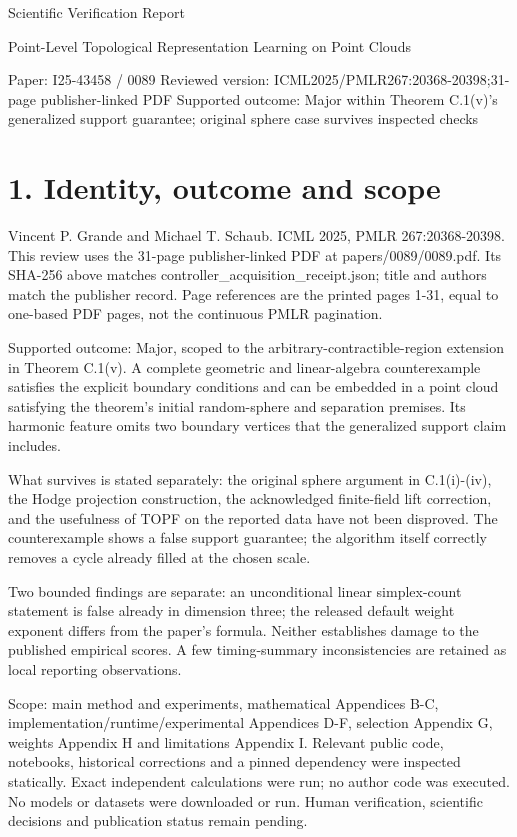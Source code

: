 \documentclass[10pt]{article}
\begin{document}
Scientific Verification Report\par
Point-Level Topological Representation Learning on Point Clouds\par
Paper: I25-43458 / 0089
Reviewed version: ICML2025/PMLR267:20368-20398;31-page publisher-linked PDF
Supported outcome: Major within Theorem C.1(v)’s generalized support guarantee; original sphere case survives inspected checks\par
\section*{1. Identity, outcome and scope}
Vincent P. Grande and Michael T. Schaub. ICML 2025, PMLR 267:20368-20398. This review uses the 31-page publisher-linked PDF at papers/0089/0089.pdf. Its SHA-256 above matches controller\_acquisition\_receipt.json; title and authors match the publisher record. Page references are the printed pages 1-31, equal to one-based PDF pages, not the continuous PMLR pagination.\par
Supported outcome: Major, scoped to the arbitrary-contractible-region extension in Theorem C.1(v). A complete geometric and linear-algebra counterexample satisfies the explicit boundary conditions and can be embedded in a point cloud satisfying the theorem’s initial random-sphere and separation premises. Its harmonic feature omits two boundary vertices that the generalized support claim includes.\par
What survives is stated separately: the original sphere argument in C.1(i)-(iv), the Hodge projection construction, the acknowledged finite-field lift correction, and the usefulness of TOPF on the reported data have not been disproved. The counterexample shows a false support guarantee; the algorithm itself correctly removes a cycle already filled at the chosen scale.\par
Two bounded findings are separate: an unconditional linear simplex-count statement is false already in dimension three; the released default weight exponent differs from the paper’s formula. Neither establishes damage to the published empirical scores. A few timing-summary inconsistencies are retained as local reporting observations.\par
Scope: main method and experiments, mathematical Appendices B-C, implementation/runtime/experimental Appendices D-F, selection Appendix G, weights Appendix H and limitations Appendix I. Relevant public code, notebooks, historical corrections and a pinned dependency were inspected statically. Exact independent calculations were run; no author code was executed. No models or datasets were downloaded or run. Human verification, scientific decisions and publication status remain pending.\par
\end{document}
